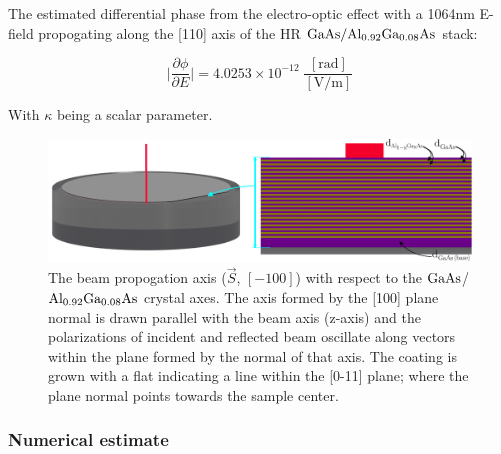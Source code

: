 The estimated differential phase from the electro-optic effect with a 1064nm E-field propogating along the [110] axis of the HR $\mathrm{GaAs} / \mathrm{Al_{0.92}Ga_{0.08}As}$ stack:

$$
\bigg| \frac{\partial \phi}{\partial E} \bigg| = 4.0253 \times 10^{-12} \; \frac{[\mathrm{rad}]}{[\mathrm{V}/\mathrm{m}]}
$$


With $\kappa$ being a scalar parameter.

\begin{figure}[!ht]
	\includegraphics[width=\textwidth]{figs/ALGAAS/ALGAAS_HR_layers_ann.pdf}
\caption{The beam propogation axis ($\vec{S}$, $[-100]$) with respect to the $\mathrm{GaAs}$/$\mathrm{Al_{0.92}Ga_{0.08}As}$ crystal axes. The axis formed by the [100] plane normal is drawn parallel with the beam axis (z-axis) and the polarizations of incident and reflected beam oscillate along vectors within the plane formed by the normal of that axis. The coating is grown with a flat indicating a line within the [0-11] plane; where the plane normal points towards the sample center.}
\label{fig:HRlayers}
\end{figure}


\subsubsection*{Numerical estimate}

